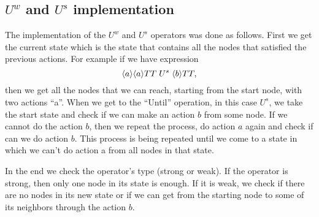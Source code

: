 \subsection{$U^{w}$ and $U^{s}$ implementation}
The implementation of the $U^{w}$ and $U^{s}$ operators was done as follows. First we get the current state which is the state that contains all the nodes that satisfied the previous actions. For example if we have expression 
\begin{equation*}
	\langle a\rangle\langle a\rangle TT \hspace{1 mm} U^{s} \hspace{1 mm} \langle b\rangle TT, 
\end{equation*}
then we get all the nodes that we can reach, starting from the start node, with two actions “a”. When we get to the “Until” operation, in this case $U^{s}$, we take the start state and check if we can make an action $b$ from some node. If we cannot do the action $b$, then we repeat the process, do action $a$ again and check if can we do action $b$. This process is being repeated until we come to a state in which we can't do action a from all nodes in that state.

In the end we check the operator's type (strong or weak). If the operator is strong, then only one node in its state is enough. If it is weak, we check if there are no nodes in its new state or if we can get from the starting node to some of its neighbors through the action $b$. 

